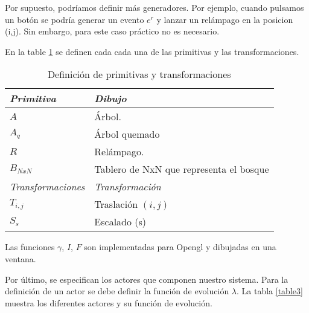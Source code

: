 \documentclass{egpubl}
\begin{document}
Por supuesto, podr\'iamos definir m\'as generadores. Por ejemplo, cuando pulsamos
un bot\'on se podr\'ia generar un evento $e^{r}$ y lanzar un rel\'ampago en la
posicion (i,j). Sin embargo, para este caso pr\'actico no es necesario.

En la table \ref{table2} se definen cada cada una de las primitivas y las
transformaciones.


\begin{table}[h]
\begin{center}
\begin{small}
\begin{tabular}{|l|l|}

	\hline
	\itshape Primitiva &
	\itshape Dibujo\\

	\hline
	$A$ &
	\'Arbol.\\

	\hline
	$A_{q}$ &
	\'Arbol quemado\\

	\hline
	$R$ &
	Rel\'ampago.\\

	\hline
	$B_{NxN}$ &
	Tablero de NxN que representa
	el bosque\\

	\hline
	\hline
	\itshape Transformaciones &
	\itshape Transformaci\'on\\

	\hline
	$T_{i,j}$ &
	Traslaci\'on $(i,j)$\\

	\hline
	$S_{s}$ &
	Escalado (s)\\
	
	\hline

\end{tabular}
\end{small}
\caption{\label{table2} Definici\'on de primitivas y transformaciones}
\end{center}
\end{table}


Las funciones $\gamma$, $I$, $F$ son implementadas para Opengl y dibujadas en una ventana.

Por \'ultimo, se especifican los actores que componen nuestro sistema. 
Para la definici\'on de un actor se debe definir la funci\'on de evoluci\'on
$\lambda$. La tabla \ref{table3} muestra los diferentes actores y su funci\'on de evoluci\'on.
\end{document}
